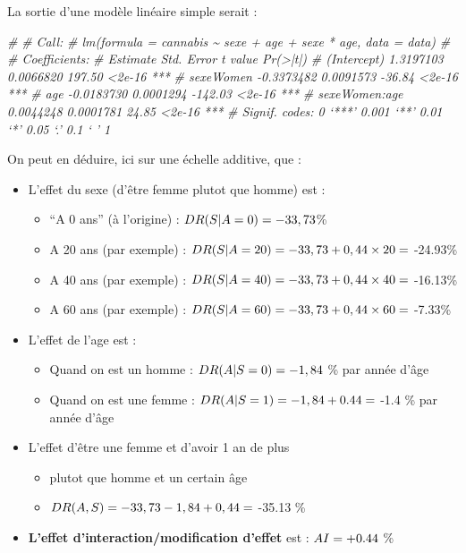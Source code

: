 \documentclass[
]{book}
\newenvironment{Shaded}{\begin{snugshade}}{\end{snugshade}}
\newcommand{\CommentTok}[1]{\textcolor[rgb]{0.56,0.35,0.01}{\textit{#1}}}
\providecommand{\tightlist}{%
  \setlength{\itemsep}{0pt}\setlength{\parskip}{0pt}}
\begin{document}
La sortie d'une modèle linéaire simple serait :

\begin{Shaded}
\begin{Highlighting}[]
\CommentTok{\# }
\CommentTok{\# Call:}
\CommentTok{\# lm(formula = cannabis \textasciitilde{} sexe + age + sexe * age, data = data)}
\CommentTok{\# }
\CommentTok{\# Coefficients:}
\CommentTok{\#                 Estimate Std. Error t value Pr(\textgreater{}|t|)    }
\CommentTok{\# (Intercept)    1.3197103  0.0066820  197.50   \textless{}2e{-}16 ***}
\CommentTok{\# sexeWomen     {-}0.3373482  0.0091573  {-}36.84   \textless{}2e{-}16 ***}
\CommentTok{\# age           {-}0.0183730  0.0001294 {-}142.03   \textless{}2e{-}16 ***}
\CommentTok{\# sexeWomen:age  0.0044248  0.0001781   24.85   \textless{}2e{-}16 ***}
\CommentTok{\# Signif. codes:  0 ‘***’ 0.001 ‘**’ 0.01 ‘*’ 0.05 ‘.’ 0.1 ‘ ’ 1}
\end{Highlighting}
\end{Shaded}

On peut en déduire, ici sur une échelle additive, que :

\begin{itemize}
\tightlist
\item
  L'effet du sexe (d'être femme plutot que homme) est :

  \begin{itemize}
  \tightlist
  \item
    ``A 0 ans'' (à l'origine) : \(\small DR(S|A=0) = -33,73\)\%
  \item
    A 20 ans (par exemple) : \(\small DR(S|A=20) = -33,73 + 0,44 \times 20 =\) -24.93\%
  \item
    A 40 ans (par exemple) : \(\small DR(S|A=40) = -33,73 + 0,44 \times 40 =\) -16.13\%
  \item
    A 60 ans (par exemple) : \(\small DR(S|A=60) = -33,73 + 0,44 \times 60 =\) -7.33\%
  \end{itemize}
\item
  L'effet de l'age est :

  \begin{itemize}
  \tightlist
  \item
    Quand on est un homme : \(\small DR(A|S=0) = -1,84\) \% par année d'âge
  \item
    Quand on est une femme : \(\small DR(A|S=1) = -1,84 + 0.44 =\) -1.4 \% par année d'âge
  \end{itemize}
\item
  L'effet d'être une femme et d'avoir 1 an de plus

  \begin{itemize}
  \tightlist
  \item
    plutot que homme et un certain âge
  \item
    \(\small DR(A,S) = -33,73 -1,84 + 0,44 =\) -35.13 \%
  \end{itemize}
\item
  \textbf{L'effet d'interaction/modification d'effet} est : \(\small AI = +0.44\) \%
\end{itemize}
\end{document}
